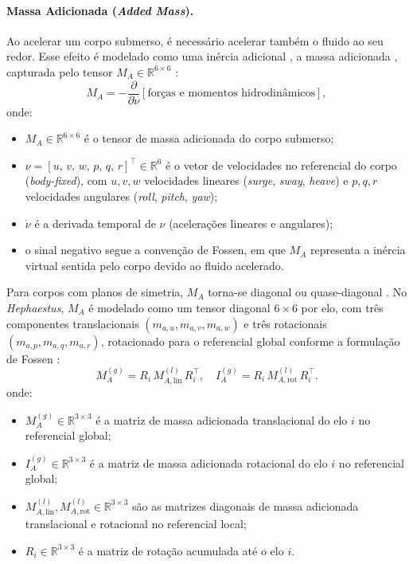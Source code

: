 \paragraph{Massa Adicionada (\textit{Added Mass}).}
Ao acelerar um corpo submerso, é necessário acelerar também o fluido ao seu redor. Esse efeito é modelado como uma inércia adicional , a massa adicionada , capturada pelo tensor $M_A \in \mathbb{R}^{6 \times 6}$ \cite{fossen2011handbook, newman1977marine}:
\begin{equation}
    M_A = -\frac{\partial}{\partial \dot{\nu}}\left[\text{forças e momentos hidrodinâmicos}\right],
    \label{eq:added_mass_def}
\end{equation}
onde:
\begin{itemize}
    \item $M_A \in \mathbb{R}^{6\times 6}$ é o tensor de massa adicionada do corpo submerso;
    \item $\nu = [u,\, v,\, w,\, p,\, q,\, r]^\top \in \mathbb{R}^{6}$ é o vetor de velocidades no referencial do corpo (\textit{body-fixed}), com $u, v, w$ velocidades lineares (\textit{surge}, \textit{sway}, \textit{heave}) e $p, q, r$ velocidades angulares (\textit{roll}, \textit{pitch}, \textit{yaw});
    \item $\dot{\nu}$ é a derivada temporal de $\nu$ (acelerações lineares e angulares);
    \item o sinal negativo segue a convenção de Fossen, em que $M_A$ representa a inércia virtual sentida pelo corpo devido ao fluido acelerado.
\end{itemize}
Para corpos com planos de simetria, $M_A$ torna-se diagonal ou quase-diagonal \cite{fossen2011handbook}. No \textit{Hephaestus}, $M_A$ é modelado como um tensor diagonal $6 \times 6$ por elo, com três componentes translacionais $(m_{a,u}, m_{a,v}, m_{a,w})$ e três rotacionais $(m_{a,p}, m_{a,q}, m_{a,r})$, rotacionado para o referencial global conforme a formulação de Fossen \cite{fossen2011handbook}:
\begin{equation}
    M_{A}^{(g)} = R_i\,M_{A,\text{lin}}^{(l)}\,R_i^\top, \quad
    I_{A}^{(g)} = R_i\,M_{A,\text{rot}}^{(l)}\,R_i^\top.
\end{equation}
onde:
\begin{itemize}
    \item $M_{A}^{(g)} \in \mathbb{R}^{3\times 3}$ é a matriz de massa adicionada translacional do elo $i$ no referencial global;
    \item $I_{A}^{(g)} \in \mathbb{R}^{3\times 3}$ é a matriz de massa adicionada rotacional do elo $i$ no referencial global;
    \item $M_{A,\text{lin}}^{(l)}, M_{A,\text{rot}}^{(l)} \in \mathbb{R}^{3\times 3}$ são as matrizes diagonais de massa adicionada translacional e rotacional no referencial local;
    \item $R_i \in \mathbb{R}^{3\times 3}$ é a matriz de rotação acumulada até o elo $i$.
\end{itemize}

